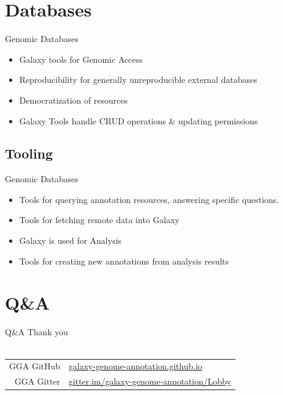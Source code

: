 \documentclass[12pt]{phage3slides} %
\begin{document}
\section{Databases}

\begin{frame}{Genomic Databases}
    \begin{itemize}
        \item Galaxy tools for Genomic Access
        \item Reproducibility for generally unreproducible external databases
        \item Democratization of resources%
        \item Galaxy Tools handle CRUD operations \& updating permissions
    \end{itemize}
\end{frame}

\subsection{Tooling}
\begin{frame}{Genomic Databases}
    \begin{itemize}
        \item Tools for querying annotation resources, answering specific questions. %
        \item Tools for fetching remote data into Galaxy
        \item Galaxy is used for Analysis
        \item Tools for creating new annotations from analysis results
    \end{itemize}
\end{frame}





\section{Q\&A}
\begin{frame}{Q\&A}
    Thank you \\\ \\
    \begin{center}
        \begin{tabular}{rl}
            \color{gray} GGA GitHub & \href{https://galaxy-genome-annotation.github.io/}{galaxy-genome-annotation.github.io}\\
            \color{gray} GGA Gitter & \href{https://gitter.im/galaxy-genome-annotation/Lobby}{gitter.im/galaxy-genome-annotation/Lobby}\\
            \end{tabular}\\[1cm]
            \fundingNSFABIannotation
    \end{center}
\end{frame}
\end{document}
